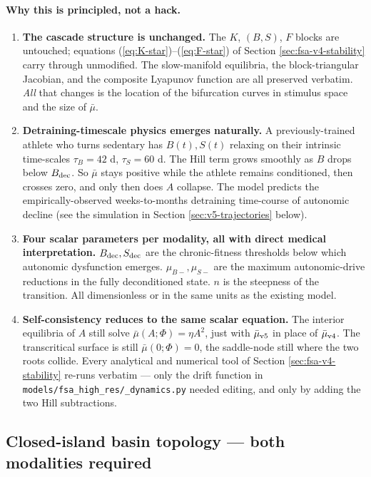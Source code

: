\paragraph{Why this is principled, not a hack.}
\begin{enumerate}
  \item \textbf{The cascade structure is unchanged.} The $K$, $(B,S)$, $F$ blocks are untouched; equations (\ref{eq:K-star})--(\ref{eq:F-star}) of Section \ref{sec:fsa-v4-stability} carry through unmodified. The slow-manifold equilibria, the block-triangular Jacobian, and the composite Lyapunov function are all preserved verbatim. \emph{All} that changes is the location of the bifurcation curves in stimulus space and the size of $\bar\mu$.
  \item \textbf{Detraining-timescale physics emerges naturally.} A previously-trained athlete who turns sedentary has $B(t), S(t)$ relaxing on their intrinsic time-scales $\tau_B = 42$ d, $\tau_S = 60$ d. The Hill term grows smoothly as $B$ drops below $B_{\rm dec}$. So $\bar\mu$ stays positive while the athlete remains conditioned, then crosses zero, and only then does $A$ collapse. The model predicts the empirically-observed weeks-to-months detraining time-course of autonomic decline (see the simulation in Section \ref{sec:v5-trajectories} below).
  \item \textbf{Four scalar parameters per modality, all with direct medical interpretation.} $B_{\rm dec}, S_{\rm dec}$ are the chronic-fitness thresholds below which autonomic dysfunction emerges. $\mu_{B-}, \mu_{S-}$ are the maximum autonomic-drive reductions in the fully deconditioned state. $n$ is the steepness of the transition. All dimensionless or in the same units as the existing model.
  \item \textbf{Self-consistency reduces to the same scalar equation.} The interior equilibria of $A$ still solve $\bar\mu(A;\Phi) = \eta A^2$, just with $\bar\mu_{\rm v5}$ in place of $\bar\mu_{\rm v4}$. The transcritical surface is still $\bar\mu(0;\Phi) = 0$, the saddle-node still where the two roots collide. Every analytical and numerical tool of Section \ref{sec:fsa-v4-stability} re-runs verbatim --- only the drift function in \texttt{models/fsa\_high\_res/\_dynamics.py} needed editing, and only by adding the two Hill subtractions.
\end{enumerate}

\subsection{Closed-island basin topology --- both modalities required}

